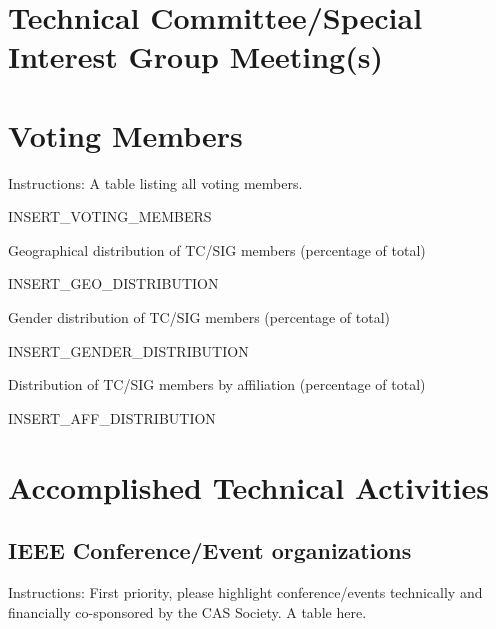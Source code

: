 \documentclass{article}
\begin{document}




\setcounter{page}{1}

\section{Technical Committee/Special Interest Group Meeting(s)}
\label{sec:tcmeetings}



\section{Voting Members}
\label{sec:votingmembers}

Instructions: A table listing all voting members.



INSERT_VOTING_MEMBERS

Geographical distribution of TC/SIG members (percentage of total)

INSERT_GEO_DISTRIBUTION

Gender distribution of TC/SIG members (percentage of total)

INSERT_GENDER_DISTRIBUTION

Distribution of TC/SIG members by affiliation (percentage of total)

INSERT_AFF_DISTRIBUTION

\section{Accomplished Technical Activities}
\label{sec:activities}

\subsection{IEEE Conference/Event organizations}
Instructions: First priority, please highlight conference/events technically and financially co-sponsored by the CAS Society. A table here.
\end{document}
